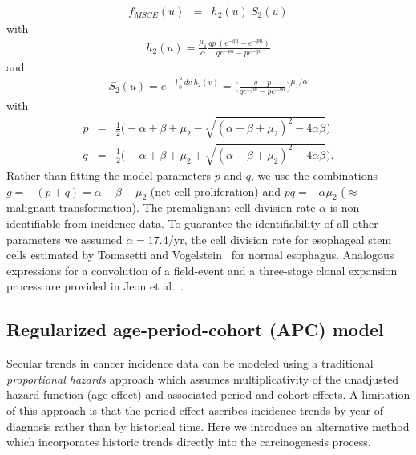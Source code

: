 \documentclass[10pt,letterpaper]{article}
\begin{document}
\begin{eqnarray}
\label{eq:MSCE}
    f_{MSCE}(u) &=& h_2(u)\ S_2(u)
\end{eqnarray}
with    
\begin{eqnarray}
\label{eq:h2}
    h_2(u) = \frac{\mu_1}{\alpha} \frac{q p\ (e^{-q u}-e^{-p u})}{q e^{-p u}-p e^{-q u}}
\end{eqnarray}
and
\begin{eqnarray}
\label{eq:S2}
    S_2(u) = e^{-\int_0^u dv \ h_2(v)} = \big( \frac{q-p}{qe^{-pu}-pe^{-qu}} \big) ^{\mu_1/\alpha}
\end{eqnarray}
with
\begin{eqnarray}
\label{eq:pq}
    p &=& \frac{1}{2} \big( -\alpha+\beta+\mu_2 -\sqrt{(\alpha+\beta+\mu_2)^2 -4\alpha\beta} \big) \\ \nonumber
    q &=& \frac{1}{2} \big( -\alpha+\beta+\mu_2 +\sqrt{(\alpha+\beta+\mu_2)^2 -4\alpha\beta} \big) .
\end{eqnarray}
Rather than fitting the model parameters $p$ and $q$, we use the combinations $g=-(p+q)=\alpha-\beta-\mu_2$ (net cell proliferation) and $pq=-\alpha\mu_2$ ($\approx$ malignant transformation). The premalignant cell division rate $\alpha$ is non-identifiable from incidence data. To guarantee the identifiability of all other parameters we assumed $\alpha=17.4$/yr, the cell division rate for esophageal stem cells estimated by Tomasetti and Vogelstein~\cite{Tomasetti2015} for normal esophagus. Analogous expressions for a convolution of a field-event and a three-stage clonal expansion process are provided in Jeon et al.~\cite{Jeon2006}. 

\subsection*{Regularized age-period-cohort (APC) model}
Secular trends in cancer incidence data can be modeled using a traditional {\it proportional hazards} approach which assumes multiplicativity of the unadjusted hazard function (age effect) and associated period and cohort effects. A limitation of this approach is that the period effect ascribes incidence trends by year of diagnosis rather than by historical time. Here we introduce an alternative method which incorporates historic trends directly into the carcinogenesis process. 
\end{document}
